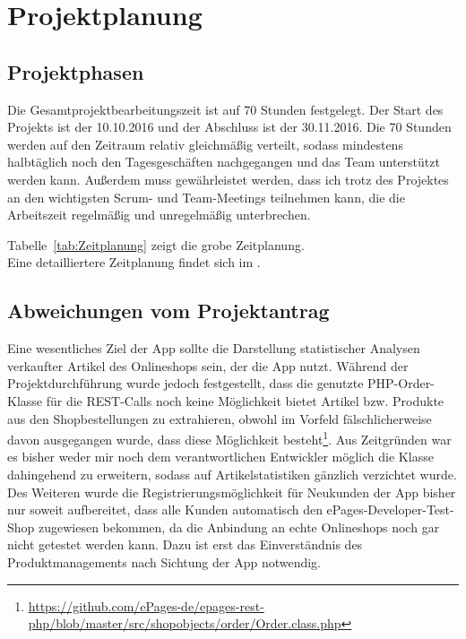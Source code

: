 \section{Projektplanung} 
\label{sec:Projektplanung}


\subsection{Projektphasen}
\label{sec:Projektphasen}

Die Gesamtprojektbearbeitungszeit ist auf 70 Stunden festgelegt. Der Start des Projekts ist der 10.10.2016 und der Abschluss ist der 30.11.2016. Die 70 Stunden werden auf den Zeitraum relativ gleichmäßig verteilt, sodass mindestens halbtäglich noch den Tagesgeschäften nachgegangen und das Team unterstützt werden kann. Außerdem muss gewährleistet werden, dass ich trotz des Projektes an den wichtigsten Scrum- und Team-Meetings teilnehmen kann, die die Arbeitszeit regelmäßig und unregelmäßig unterbrechen.

Tabelle~\ref{tab:Zeitplanung} zeigt die grobe Zeitplanung.
\\
Eine detailliertere Zeitplanung findet sich im .


\subsection{Abweichungen vom Projektantrag}
\label{sec:AbweichungenProjektantrag}

Eine wesentliches Ziel der App sollte die Darstellung statistischer Analysen verkaufter Artikel des Onlineshops sein, der die App nutzt. Während der Projektdurchführung wurde jedoch festgestellt, dass die genutzte PHP-Order-Klasse für die REST-Calls noch keine Möglichkeit bietet Artikel bzw. Produkte aus den Shopbestellungen zu extrahieren, obwohl im Vorfeld fälschlicherweise davon ausgegangen wurde, dass diese Möglichkeit besteht\footnote{\url{https://github.com/ePages-de/epages-rest-php/blob/master/src/shopobjects/order/Order.class.php}}. Aus Zeitgründen war es bisher weder mir noch dem verantwortlichen Entwickler möglich die Klasse dahingehend zu erweitern, sodass auf Artikelstatistiken gänzlich verzichtet wurde. Des Weiteren wurde die Registrierungsmöglichkeit für Neukunden der App bisher nur soweit aufbereitet, dass alle Kunden automatisch den ePages-Developer-Test-Shop zugewiesen bekommen, da die Anbindung an echte Onlineshops noch gar nicht getestet werden kann. Dazu ist erst das Einverständnis des Produktmanagements nach Sichtung der App notwendig. 



